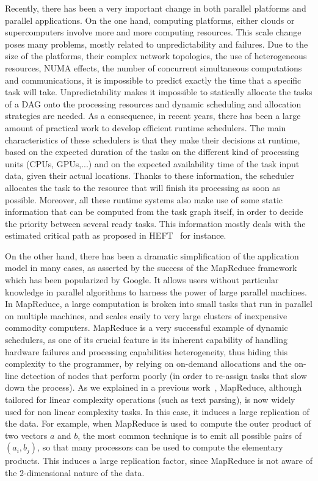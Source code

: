 \documentclass[a4paper,10pt]{article}
\newcommand{\mapreduce}{MapReduce\xspace}
\begin{document}
Recently, there has been a very important change in both parallel
platforms and parallel applications. On the one hand, computing
platforms, either clouds or supercomputers involve more and more
computing resources. This scale change poses many problems, mostly
related to unpredictability and failures. 
Due to the size of the platforms, their complex
network topologies, the use of heterogeneous resources, NUMA effects,
the number of concurrent simultaneous computations and communications,
it is impossible to predict exactly the time that a specific task will
take. Unpredictability makes it impossible to statically allocate the
tasks of a DAG onto the processing resources and dynamic scheduling and allocation strategies
are needed. As a consequence, in recent years, there has been a large
amount of practical work to develop efficient runtime schedulers. The main
characteristics of these schedulers is that they make their decisions
at runtime, based on the expected duration of the tasks on the
different kind of processing units (CPUs, GPUs,...) and on the
expected availability time of the task input data, given their actual
locations. Thanks to these information, the scheduler allocates the
task to the resource that will finish its processing as soon as possible.
Moreover, all these runtime systems also make use of some
static information that can be computed from the task graph itself, in
order to decide the priority between several ready tasks. This
information mostly deals with the estimated critical path as proposed
in HEFT~\cite{heft} for instance.

On the other hand, there has been a dramatic simplification of the
application model in many cases, as asserted by the success of the
\mapreduce framework~\cite{dean2008mapreduce} which has been
popularized by Google. It allows users without particular knowledge in
parallel algorithms to harness the power of large parallel machines. In
\mapreduce, a large computation is broken into small tasks that run in
parallel on multiple machines, and scales easily to very large
clusters of inexpensive commodity computers. \mapreduce is a very
successful example of dynamic schedulers, as one of its crucial
feature is its inherent capability of handling hardware failures and
processing capabilities heterogeneity, thus hiding this complexity to
the programmer, by relying on on-demand allocations and the on-line detection of
nodes that perform poorly (in order to re-assign tasks that slow down
the process). As we explained in a previous work~\cite{nofreelunch},
\mapreduce, although tailored for linear complexity operations (such as
text parsing), is now widely used for non linear complexity tasks. In
this case, it induces a large replication of the data. For example,
when \mapreduce is used to compute the outer product of two vectors
$a$ and $b$, the most common technique is to emit all possible pairs
of $(a_i,b_j)$, so that many processors can be used to compute the
elementary products. This induces a large replication factor, since
\mapreduce is not aware of the 2-dimensional nature of the data.
\end{document}
